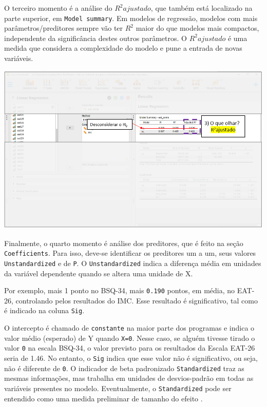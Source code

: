 \documentclass[
]{book}
\begin{document}
O terceiro momento é a análise do \(R^2 ajustado\), que também está localizado na parte superior, em \texttt{Model\ summary}. Em modelos de regressão, modelos com mais parâmetros/preditores sempre vão ter \(R^2\) maior do que modelos mais compactos, independente da significância destes outros parâmetros. O \(R^2 ajustado\) é uma medida que considera a complexidade do modelo e pune a entrada de novas variáveis.

\includegraphics{./img/cap_reg_multipla_resultado_3.png}

Finalmente, o quarto momento é análise dos preditores, que é feito na seção \texttt{Coefficients}. Para isso, deve-se identificar os preditores um a um, seus valores \texttt{Unstandardized} e de \texttt{P}. O \texttt{Unstandardized} indica a diferença média em unidades da variável dependente quando se altera uma unidade de X.

Por exemplo, mais 1 ponto no BSQ-34, mais \texttt{0.190} pontos, em média, no EAT-26, controlando pelos resultados do IMC. Esse resultado é significativo, tal como é indicado na coluna \texttt{Sig}.

O intercepto é chamado de \texttt{constante} na maior parte dos programas e indica o valor médio (esperado) de Y quando \texttt{X=0}. Nesse caso, se alguém tivesse tirado o valor \texttt{0} na escala BSQ-34, o valor previsto para os resultados da Escala EAT-26 seria de 1.46. No entanto, o \texttt{Sig} indica que esse valor não é significativo, ou seja, não é diferente de \texttt{0}. O indicador de beta padronizado \texttt{Standardized} traz as mesmas informações, mas trabalha em unidades de desvios-padrão em todas as variáveis presentes no modelo. Eventualmente, o \texttt{Standardized} pode ser entendido como uma medida preliminar de tamanho do efeito \citep{fox2016}.
\end{document}
